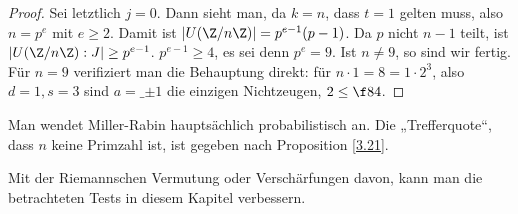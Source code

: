 \begin{prop}
\begin{proof}
		Sei letztlich $j = 0$.
		Dann sieht man, da $k = n$, dass $t = 1$ gelten muss, also $n = p^e$ mit $e \ge 2$.
		Damit ist $|U(\Z / n\Z)| = p^{e-1}(p-1)$.
		Da $p$ nicht $n-1$ teilt, ist $|U(\Z / n\Z) : J| \ge p^{e-1}$.
		$p^{e-1} \ge 4$, es sei denn $p^e = 9$.
		Ist $n \neq 9$, so sind wir fertig.
		Für $n = 9$ verifiziert man die Behauptung direkt: für $n \cdot 1 = 8 = 1 \cdot 2^3$, also $d = 1, s=3$ sind $a=\_{\pm 1}$ die einzigen Nichtzeugen, $2 \le \f 84$.
	\end{proof}
\end{prop}

Man wendet Miller-Rabin hauptsächlich probabilistisch an.
Die „Trefferquote“, dass $n$ keine Primzahl ist, ist gegeben nach Proposition \ref{3.21}.

Mit der Riemannschen Vermutung oder Verschärfungen davon, kann man die betrachteten Tests in diesem Kapitel verbessern.




